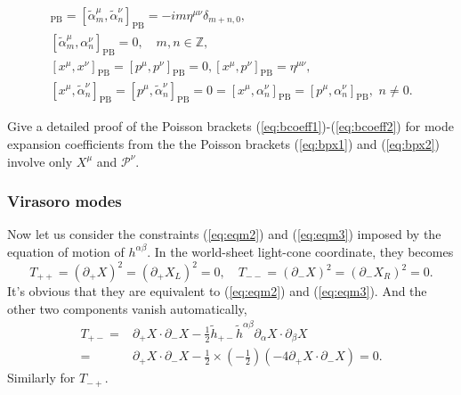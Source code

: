 \documentclass[graybox,envcountchap,sectrefs]{svmono}
\begin{document}
\begin{svgraybox}
\begin{align}
[\alpha_{m}^{\mu}, \alpha_{n}^{\nu}]_{\mathrm{PB}}=[\tilde{\alpha}_{m}^{\mu}, \tilde{\alpha}_{n}^{\nu}]_{\mathrm{PB}}=-i m \eta^{\mu \nu} \delta_{m+n, 0}, \label{eq:bcoeff1}\\
[\tilde{\alpha}_{m}^{\mu}, \alpha_{n}^{\nu}]_{\mathrm{PB}}=0, \quad m, n \in \mathbb{Z},\label{eq:bcoeff2}\\
[x^{\mu}, x^{\nu}]_{\mathrm{PB}}=[p^{\mu}, p^{\nu}]_{\mathrm{PB}}=0,  [x^{\mu}, p^{\nu}]_{\mathrm{PB}}=\eta^{\mu \nu}, \\
[x^{\mu}, \tilde{\alpha}_{n}^{\nu}]_{\mathrm{PB}}=[p^{\mu}, \tilde{\alpha}_{n}^{\nu}]_{\mathrm{PB}}=0=[x^{\mu}, \alpha_{n}^{\nu}]_{\mathrm{PB}}=[p^{\mu}, \alpha_{n}^{\nu}]_{\mathrm{PB}}, \,\, n\neq 0.
\end{align}
\end{svgraybox}
\begin{exercise}
Give a detailed proof of the Poisson brackets (\ref{eq:bcoeff1})-(\ref{eq:bcoeff2}) for mode expansion coefficients from the the Poisson brackets (\ref{eq:bpx1}) and (\ref{eq:bpx2}) involve only $X^{\mu}$ and $\mathcal{P}^{\nu}$.
\end{exercise}

\subsubsection*{Virasoro modes}
Now let us consider the constraints (\ref{eq:eqm2}) and (\ref{eq:eqm3}) imposed by the equation of motion of $h^{\alpha\beta}$. In the world-sheet light-cone coordinate, they becomes
\begin{equation}
T_{++}=(\partial_{+}X)^2=(\partial_{+}X_{L})^2=0,\quad
T_{--}=(\partial_{-}X)^2=(\partial_{-}X_{R})^2=0.
\end{equation}
It's obvious that they are equivalent to (\ref{eq:eqm2}) and (\ref{eq:eqm3}). 
And the other two components vanish automatically,
\begin{align}
T_{+-}=&\partial_+X\cdot\partial_{-}X-\frac{1}{2}\tilde{h}_{+-}\tilde{h}^{\alpha\beta}\partial_{\alpha}X\cdot\partial_{\beta} X\nonumber\\
=&\partial_+X\cdot\partial_{-}X-\frac{1}{2}\times (-\frac{1}{2})(-4\partial_+X\cdot\partial_{-}X)=0.
\end{align}
Similarly for $T_{-+}$.
\end{document}
